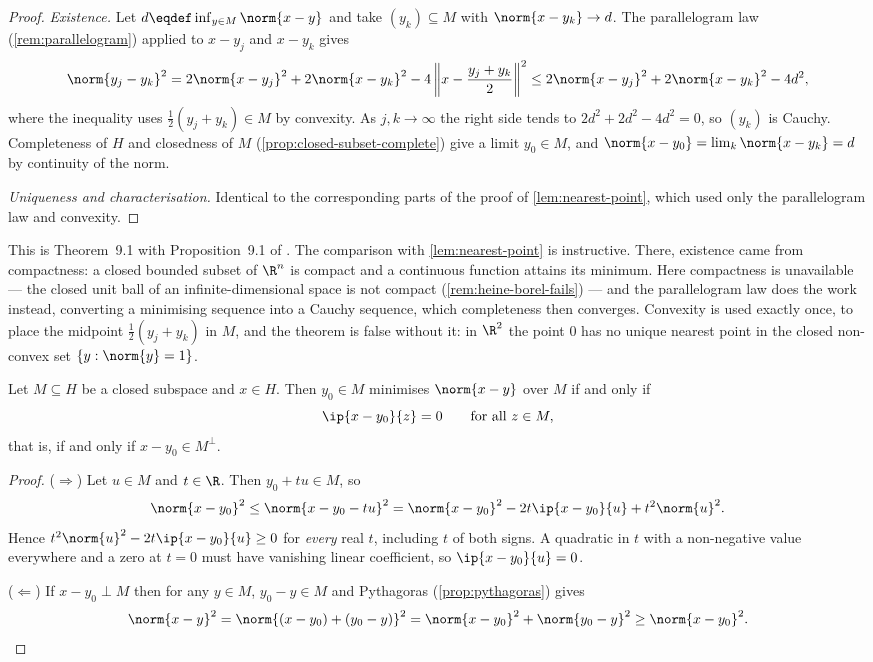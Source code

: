 \begin{proof}
	\emph{Existence.} Let $d\eqdef\inf_{y\in M}\norm{x-y}$ and take
	$(y_k)\subseteq M$ with $\norm{x-y_k}\to d$. The parallelogram law
	(\autoref{rem:parallelogram}) applied to $x-y_j$ and $x-y_k$ gives
	\[
		\norm{y_j-y_k}^2
		=2\norm{x-y_j}^2+2\norm{x-y_k}^2-4\left\lVert x-\frac{y_j+y_k}{2}\right\rVert^2
		\leq2\norm{x-y_j}^2+2\norm{x-y_k}^2-4d^2,
	\]
	where the inequality uses $\tfrac12(y_j+y_k)\in M$ by convexity. As
	$j,k\to\infty$ the right side tends to $2d^2+2d^2-4d^2=0$, so $(y_k)$ is
	Cauchy. Completeness of $H$ and closedness of $M$
	(\autoref{prop:closed-subset-complete}) give a limit $y_0\in M$, and
	$\norm{x-y_0}=\lim_k\norm{x-y_k}=d$ by continuity of the norm.

	\emph{Uniqueness and characterisation.} Identical to the corresponding parts of
	the proof of \autoref{lem:nearest-point}, which used only the parallelogram law
	and convexity.
\end{proof}

This is Theorem~9.1 with Proposition~9.1 of
\textcite[pp.~295--298]{fukuda2026notes}. The comparison with
\autoref{lem:nearest-point} is instructive. There, existence came from
compactness: a closed bounded subset of $\R^n$ is compact and a continuous
function attains its minimum. Here compactness is unavailable --- the closed unit
ball of an infinite-dimensional space is not compact
(\autoref{rem:heine-borel-fails}) --- and the parallelogram law does the work
instead, converting a minimising sequence into a Cauchy sequence, which
completeness then converges. Convexity is used exactly once, to place the
midpoint $\tfrac12(y_j+y_k)$ in $M$, and the theorem is false without it: in
$\R^2$ the point $0$ has no unique nearest point in the closed non-convex set
$\{y:\norm{y}=1\}$.

\begin{proposition}\label{prop:proj-subspace-char}
	Let $M\subseteq H$ be a closed subspace and $x\in H$. Then $y_0\in M$ minimises
	$\norm{x-y}$ over $M$ if and only if
	\begin{equation}\label{eq:orthogonality-condition}
		\ip{x-y_0}{z}=0\qquad\text{for all }z\in M,
	\end{equation}
	that is, if and only if $x-y_0\in M^{\perp}$.
\end{proposition}

\begin{proof}
	($\Rightarrow$) Let $u\in M$ and $t\in\R$. Then $y_0+tu\in M$, so
	\[
		\norm{x-y_0}^2\leq\norm{x-y_0-tu}^2
		=\norm{x-y_0}^2-2t\ip{x-y_0}{u}+t^2\norm{u}^2 .
	\]
	Hence $t^2\norm{u}^2-2t\ip{x-y_0}{u}\geq0$ for \emph{every} real $t$,
	including $t$ of both signs. A quadratic in $t$ with a non-negative value
	everywhere and a zero at $t=0$ must have vanishing linear coefficient, so
	$\ip{x-y_0}{u}=0$.

	($\Leftarrow$) If $x-y_0\perp M$ then for any $y\in M$, $y_0-y\in M$ and
	Pythagoras (\autoref{prop:pythagoras}) gives
	\[
		\norm{x-y}^2=\norm{(x-y_0)+(y_0-y)}^2=\norm{x-y_0}^2+\norm{y_0-y}^2
		\geq\norm{x-y_0}^2 .
	\]
\end{proof}

